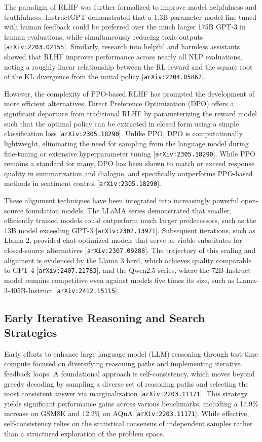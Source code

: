 \documentclass[11pt]{article}
\begin{document}
The paradigm of RLHF was further formalized to improve model helpfulness and truthfulness. InstructGPT demonstrated that a 1.3B parameter model fine-tuned with human feedback could be preferred over the much larger 175B GPT-3 in human evaluations, while simultaneously reducing toxic outputs [\texttt{arXiv:2203.02155}]. Similarly, research into helpful and harmless assistants showed that RLHF improves performance across nearly all NLP evaluations, noting a roughly linear relationship between the RL reward and the square root of the KL divergence from the initial policy [\texttt{arXiv:2204.05862}].

However, the complexity of PPO-based RLHF has prompted the development of more efficient alternatives. Direct Preference Optimization (DPO) offers a significant departure from traditional RLHF by parameterizing the reward model such that the optimal policy can be extracted in closed form using a simple classification loss [\texttt{arXiv:2305.18290}]. Unlike PPO, DPO is computationally lightweight, eliminating the need for sampling from the language model during fine-tuning or extensive hyperparameter tuning [\texttt{arXiv:2305.18290}]. While PPO remains a standard for many, DPO has been shown to match or exceed response quality in summarization and dialogue, and specifically outperforms PPO-based methods in sentiment control [\texttt{arXiv:2305.18290}].

These alignment techniques have been integrated into increasingly powerful open-source foundation models. The LLaMA series demonstrated that smaller, efficiently trained models could outperform much larger predecessors, such as the 13B model exceeding GPT-3 [\texttt{arXiv:2302.13971}]. Subsequent iterations, such as Llama 2, provided chat-optimized models that serve as viable substitutes for closed-source alternatives [\texttt{arXiv:2307.09288}]. The trajectory of this scaling and alignment is evidenced by the Llama 3 herd, which achieves quality comparable to GPT-4 [\texttt{arXiv:2407.21783}], and the Qwen2.5 series, where the 72B-Instruct model remains competitive even against models five times its size, such as Llama-3-405B-Instruct [\texttt{arXiv:2412.15115}].

\subsection{Early Iterative Reasoning and Search Strategies}

Early efforts to enhance large language model (LLM) reasoning through test-time compute focused on diversifying reasoning paths and implementing iterative feedback loops. A foundational approach is self-consistency, which moves beyond greedy decoding by sampling a diverse set of reasoning paths and selecting the most consistent answer via marginalization [\texttt{arXiv:2203.11171}]. This strategy yields significant performance gains across various benchmarks, including a 17.9\% increase on GSM8K and 12.2\% on AQuA [\texttt{arXiv:2203.11171}]. While effective, self-consistency relies on the statistical consensus of independent samples rather than a structured exploration of the problem space.
\end{document}
